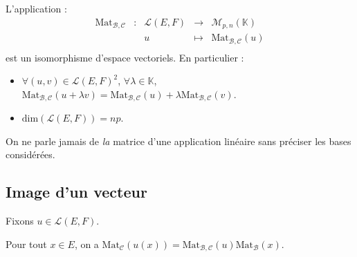 \documentclass[a4paper,10pt]{report}
\begin{document}
\begin{thm} L'application :
$$ \begin{array}{ccccl}
\textrm{Mat}_{\mathcal{B}, \mathcal{C}} & : & \mathcal{L}(E,F) & \rightarrow & \mathcal{M}_{p,n}(\mathbb{K}) \\
& & u & \mapsto & \textrm{Mat}_{\mathcal{B}, \mathcal{C}}(u) \\
\end{array}$$
est un isomorphisme d'espace vectoriels. En particulier :

\begin{itemize}
\item $\forall (u,v) \in \mathcal{L}(E,F)^2$, $\forall \lambda \in \mathbb{K}$, $\textrm{Mat}_{\mathcal{B}, \mathcal{C}}(u + \lambda v) = \textrm{Mat}_{\mathcal{B}, \mathcal{C}}(u) + \lambda \textrm{Mat}_{\mathcal{B}, \mathcal{C}}(v)$.
\item $\textrm{dim}(\mathcal{L}(E,F)) = np$.
\end{itemize}
\end{thm}

\begin{att} On ne parle jamais de \textit{la} matrice d'une application linéaire sans préciser les bases considérées.
\end{att}

\subsection{Image d'un vecteur}
\noindent Fixons $u \in \mathcal{L}(E,F)$.

\begin{prop} Pour tout $x \in E$, on a $\textrm{Mat}_{\mathcal{C}}(u(x)) = \textrm{Mat}_{\mathcal{B}, \mathcal{C}}(u) \textrm{Mat}_{\mathcal{B}}(x)$.
\end{prop}

%
%
\end{document}

